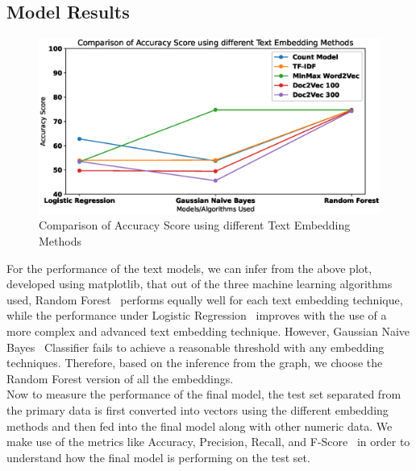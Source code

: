 \documentclass[conference]{IEEEtran}
\begin{document}
\subsection{Model Results}
\begin{figure}
\includegraphics[width=\linewidth]{AccScoreTextModel.eps}
\caption{Comparison of Accuracy Score using different Text Embedding Methods} \label{fig2}
\end{figure}
For the performance of the text models, we can infer from the above plot, developed using matplotlib, that out of the three machine learning algorithms used, Random Forest~\cite{rf} performs equally well for each text embedding technique, while the performance under Logistic Regression~\cite{lr} improves with the use of a more complex and advanced text embedding technique. However, Gaussian Naive Bayes~\cite{nb} Classifier fails to achieve a reasonable threshold with any embedding techniques. Therefore, based on the inference from the graph, we choose the Random Forest version of all the embeddings.\\
Now to measure the performance of the final model, the test set separated from the primary data is first converted into vectors using the different embedding methods and then fed into the final model along with other numeric data. We make use of the metrics like Accuracy, Precision, Recall, and F-Score~\cite{metrics} in order to understand how the final model is performing on the test set.
\end{document}
